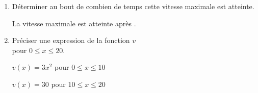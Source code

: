 \begin{corrige}
\begin{enumerate}
        {\red La vitesse maximale est de .}
        \item Déterminer au bout de combien de temps cette vitesse maximale est atteinte.
        
        {\red La vitesse maximale est atteinte après .}
        \item Préciser une expression de la fonction $v$\\pour $0 \leq x \leq 20$.
        
        {\red $v(x)=3x^2$ pour $0 \leq x \leq 10$
        
        $v(x)=30$ pour $10 \leq x \leq 20$}
    \end{enumerate}
    \vspace*{-9mm}
\end{corrige}
